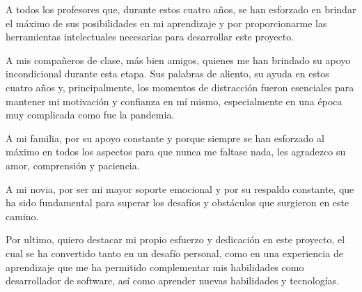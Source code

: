 A todos los profesores que, durante estos cuatro años, se han esforzado en brindar el máximo de sus posibilidades en mi aprendizaje y por proporcionarme las herramientas intelectuales necesarias para desarrollar este proyecto.

A mis compañeros de clase, más bien amigos, quienes me han brindado su apoyo incondicional durante esta etapa. Sus palabras de aliento, su ayuda en estos cuatro años y, principalmente, los momentos de distracción fueron esenciales para mantener mi motivación y confianza en mí mismo, especialmente en una época muy complicada como fue la pandemia.

A mi familia, por su apoyo constante y porque siempre se han esforzado al máximo en todos los aspectos para que nunca me faltase nada, les agradezco su amor, comprensión y paciencia.

A mi novia, por ser mi mayor soporte emocional y por su respaldo constante, que ha sido fundamental para superar los desafíos y obstáculos que surgieron en este camino.

Por ultimo, quiero destacar mi propio esfuerzo y dedicación en este proyecto, el cual se ha convertido tanto en un desafío personal, como en una experiencia de aprendizaje que me ha permitido complementar mis habilidades como desarrollador de software, así como aprender nuevas habilidades y tecnologías.

\newpage
\cleardoublepage